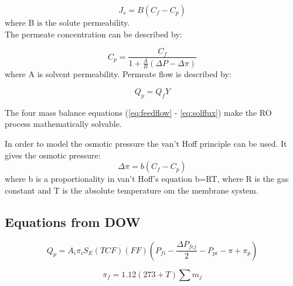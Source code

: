 \begin{equation}
\label{eq:solflux}
J_{s}=B(C_{f}- C_{p})
\end{equation}
 where B is the solute permeability.
\\The permeate concentration can be described by:

\begin{equation}
\label{eq:permcond}
C_{p}=\frac{C_{f}}{1+\frac{A}{B}(\Delta P - \Delta\pi)}
\end{equation}
where A is solvent permeability.
Permeate flow is described by:

\begin{equation}
\label{eq:permflow}
Q_{p}=Q_{f}Y
\end{equation}

The four mass balance equations (\ref{eq:feedflow} - \ref{eq:solflux}) make the RO process mathematically solvable.

In order to model the osmotic pressure the van't Hoff principle can be used. It gives the osmotic pressure:
\begin{equation}
\label{eq:posm}
\Delta\pi=b(C_{f}-C_{p})
\end{equation}
where b is a proportionality in van't Hoff's equation b=RT, where R is the gas constant and T is the absolute temperature om the membrane system. 

\subsection{Equations from DOW}
\label{sec:doweq}
\mathleft

\begin{equation}
\label{eq:pQ}
Q_{p}=A_{i}\pi_{i} S_{E}(TCF)(FF)(P_{fi}-\frac{\Delta P_{fcj}}{2}-P_{pi}-\pi+\pi_{p})
\end{equation}



\begin{equation}
\label{eq:feedOsmP}
\pi_{f}= 1.12(273+T) \sum m_{j}
\end{equation}


